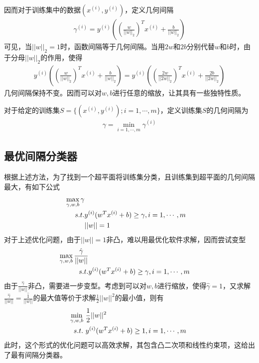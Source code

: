 因而对于训练集中的数据$(x^{(i)},y^{(i)})$，定义几何间隔
\begin{eqnarray}
\gamma^{(i)}=y^{(i)}
\left(
\left(\frac{w}{||w||_2}
\right)^Tx^{(i)}+\frac{b}{||w||_2}
\right)
\end{eqnarray}
可见，当$||w||_2=1$时，函数间隔等于几何间隔。当用$2w$和$2b$分别代替$w$和$b$时，由于分母$||w||_2$的作用，使得
\begin{eqnarray}
y^{(i)}
\left(
\left(\frac{w}{||w||_2}
\right)^Tx^{(i)}+\frac{b}{||w||_2}
\right)
=
y^{(i)}
\left(
\left(\frac{2w}{||2w||_2}
\right)^Tx^{(i)}+\frac{2b}{||2w||_2}
\right)
\end{eqnarray}
几何间隔保持不变。因而可以对$w,b$进行任意的缩放，让其具有一些独特性质。

对于给定的训练集$S=\{(x^{(i)},y^{(i)});i=1,\cdots,m\}$，定义训练集$S$的几何间隔为
\begin{eqnarray}
\gamma=\min_{i=1,\cdots,m}\gamma^{(i)}
\end{eqnarray}

\subsection{最优间隔分类器}
根据上述方法，为了找到一个超平面将训练集分类，且训练集到超平面的几何间隔最大，有如下公式
\begin{eqnarray}
\begin{aligned}
\max_{\gamma,w,b}\gamma\\
s.t. & {y}^{({i})}(w^T{x}^{({i})}+b)\geq \gamma,i=1,\cdots,m\\
& ||w||=1
\end{aligned}
\end{eqnarray}
对于上述优化问题，由于$||w||=1$非凸，难以用最优化软件求解，因而尝试变型
\begin{eqnarray}
\begin{aligned}
\max_{\gamma,w,b}\frac{\hat{\gamma}}{||w||}\\
s.t. & {y}^{({i})}(w^T{x}^{({i})}+b)\geq \gamma,i=1,\cdots,m\
\end{aligned}
\end{eqnarray}
由于$\frac{\hat{\gamma}}{||w||}$非凸，需要进一步变型。考虑到可以对$w,b$进行缩放，使得$\hat{\gamma}=1$，又求解$\frac{\hat{\gamma}}{||w||}=\frac{\hat{1}}{||w||}$的最大值等价于求解$\frac{1}{2}||w||^2$的最小值，则有
\begin{eqnarray}
\begin{aligned}
\min_{\gamma,w,b} &\ \frac{1}{2}||w||^2\\
s.t. &\ {y}^{({i})}(w^T{x}^{({i})}+b)\geq 1,i=1,\cdots,m\
\end{aligned}
\end{eqnarray}
此时，这个形式的优化问题可以高效求解，其包含凸二次项和线性约束项，这给出了最有间隔分类器。

